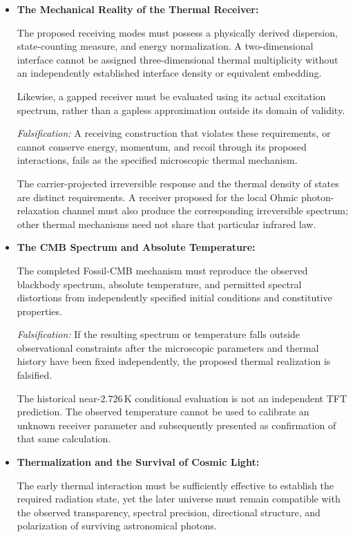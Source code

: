 \begin{itemize}

\item \textbf{The Mechanical Reality of the Thermal Receiver:}

The proposed receiving modes must possess a physically
derived dispersion, state-counting measure, and energy
normalization. A two-dimensional interface cannot be
assigned three-dimensional thermal multiplicity without
an independently established interface density or
equivalent embedding.

Likewise, a gapped receiver must be evaluated using
its actual excitation spectrum, rather than a gapless
approximation outside its domain of validity.

\textit{Falsification:} A receiving construction that
violates these requirements, or cannot conserve energy,
momentum, and recoil through its proposed interactions,
fails as the specified microscopic thermal mechanism.

The carrier-projected irreversible response and the
thermal density of states are distinct requirements.
A receiver proposed for the local Ohmic photon-relaxation
channel must also produce the corresponding irreversible
spectrum; other thermal mechanisms need not share that
particular infrared law.

\item \textbf{The CMB Spectrum and Absolute Temperature:}

The completed Fossil-CMB mechanism must reproduce the
observed blackbody spectrum, absolute temperature,
and permitted spectral distortions from independently
specified initial conditions and constitutive properties.

\textit{Falsification:} If the resulting spectrum or
temperature falls outside observational constraints
after the microscopic parameters and thermal history
have been fixed independently, the proposed thermal
realization is falsified.

The historical near-$2.726\,\mathrm K$ conditional
evaluation is not an independent TFT prediction.
The observed temperature cannot be used to calibrate
an unknown receiver parameter and subsequently
presented as confirmation of that same calculation.

\item \textbf{Thermalization and the Survival of Cosmic Light:}

The early thermal interaction must be sufficiently
effective to establish the required radiation state,
yet the later universe must remain compatible with
the observed transparency, spectral precision,
directional structure, and polarization of surviving
astronomical photons.


\end{itemize}
